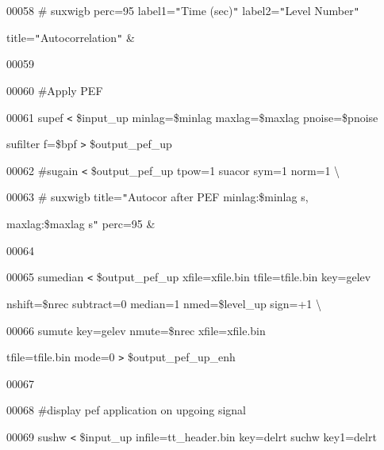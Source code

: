 \documentclass{article}
\begin{document}
\vspace{4pt}
00058 \#          \textbar{} suxwigb perc=95 label1=\texttt{"}Time (sec)\texttt{"} 
label2=\texttt{"}Level Number\texttt{"}  

\vspace{4pt}
title=\texttt{"}Autocorrelation\texttt{"} \&

\vspace{4pt}
00059 

\vspace{4pt}
00060 \#Apply PEF

\vspace{4pt}
00061 supef \texttt{<} \$input\_up minlag=\$minlag maxlag=\$maxlag pnoise=\$pnoise 
 \textbar{} 

\vspace{4pt}
sufilter f=\$bpf \texttt{>} \$output\_pef\_up

\vspace{4pt}
00062 \#sugain \texttt{<} \$output\_pef\_up tpow=1 \textbar{} suacor  sym=1 norm=1 
 \textbackslash{}

\vspace{4pt}
00063 \#          \textbar{} suxwigb title=\texttt{"}Autocor after PEF minlag:\$minlag 
s, 

\vspace{4pt}
maxlag:\$maxlag s\texttt{"} perc=95 \&

\vspace{4pt}
00064 

\vspace{4pt}
00065 sumedian \texttt{<} \$output\_pef\_up xfile=xfile.bin tfile=tfile.bin key=gelev 

\vspace{4pt}
\parindent=18pt
nshift=\$nrec subtract=0 median=1 nmed=\$level\_up sign=+1 \textbackslash{}

\vspace{16pt}
\parindent=0pt
00066            \textbar{} sumute key=gelev nmute=\$nrec xfile=xfile.bin 

\vspace{4pt}
tfile=tfile.bin mode=0 \texttt{>} \$output\_pef\_up\_enh

\vspace{4pt}
00067 

\vspace{4pt}
00068 \#display pef application on upgoing signal

\vspace{4pt}
00069 sushw \texttt{<} \$input\_up infile=tt\_header.bin key=delrt \textbar{} suchw 
key1=delrt 
\end{document}
